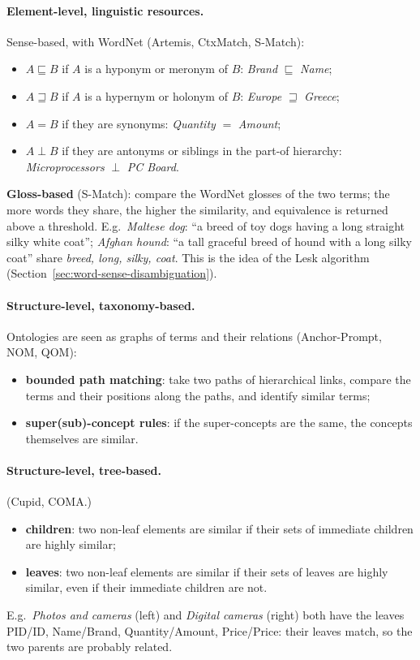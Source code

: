 \paragraph{Element-level, linguistic resources.} Sense-based, with WordNet (Artemis,
CtxMatch, S-Match):
\begin{itemize}[nosep]
  \item $A \sqsubseteq B$ if $A$ is a hyponym or meronym of $B$: \emph{Brand}
        $\sqsubseteq$ \emph{Name};
  \item $A \sqsupseteq B$ if $A$ is a hypernym or holonym of $B$: \emph{Europe}
        $\sqsupseteq$ \emph{Greece};
  \item $A = B$ if they are synonyms: \emph{Quantity} $=$ \emph{Amount};
  \item $A \perp B$ if they are antonyms or siblings in the part-of hierarchy:
        \emph{Microprocessors} $\perp$ \emph{PC Board}.
\end{itemize}
\textbf{Gloss-based} (S-Match): compare the WordNet glosses of the two terms; the more
words they share, the higher the similarity, and equivalence is returned above a
threshold. E.g.\ \emph{Maltese dog}: ``a breed of toy dogs having a long straight silky
white coat''; \emph{Afghan hound}: ``a tall graceful breed of hound with a long silky
coat'' share \emph{breed, long, silky, coat}. This is the idea of the Lesk algorithm
(Section~\ref{sec:word-sense-disambiguation}).

\paragraph{Structure-level, taxonomy-based.} Ontologies are seen as graphs of terms and
their relations (Anchor-Prompt, NOM, QOM):
\begin{itemize}[nosep]
  \item \textbf{bounded path matching}: take two paths of hierarchical links, compare the
        terms and their positions along the paths, and identify similar terms;
  \item \textbf{super(sub)-concept rules}: if the super-concepts are the same, the
        concepts themselves are similar.
\end{itemize}

\paragraph{Structure-level, tree-based.} (Cupid, COMA.)
\begin{itemize}[nosep]
  \item \textbf{children}: two non-leaf elements are similar if their sets of immediate
        children are highly similar;
  \item \textbf{leaves}: two non-leaf elements are similar if their sets of leaves are
        highly similar, even if their immediate children are not.
\end{itemize}
E.g.\ \emph{Photos and cameras} (left) and \emph{Digital cameras} (right) both have the
leaves PID/ID, Name/Brand, Quantity/Amount, Price/Price: their leaves match, so the two
parents are probably related.


